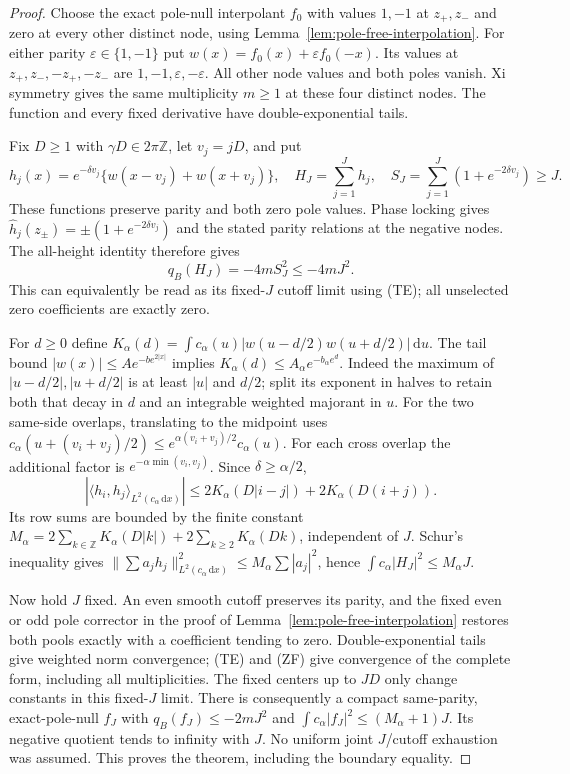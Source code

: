 \documentclass[11pt]{article}
\theoremstyle{remark}\newtheorem{remark}[theorem]{Remark}
\newcommand{\Z}{\mathbb Z}
\newcommand{\dd}{\,\mathrm d}
\begin{document}
\begin{proof}
Choose the exact pole-null interpolant $f_0$ with values
$1,-1$ at $z_+,z_-$ and zero at every other distinct node,
using Lemma~\ref{lem:pole-free-interpolation}.
For either parity $\varepsilon\in\{1,-1\}$ put
$w(x)=f_0(x)+\varepsilon f_0(-x)$. Its values at
$z_+,z_-,-z_+,-z_-$ are $1,-1,\varepsilon,-\varepsilon$.
All other node values and both poles vanish. Xi symmetry
gives the same multiplicity $m\ge1$ at these four distinct
nodes. The function and every fixed derivative have
double-exponential tails.

Fix $D\ge1$ with $\gamma D\in2\pi\Z$, let $v_j=jD$, and put
\[
 h_j(x)=e^{-\delta v_j}\{w(x-v_j)+w(x+v_j)\},\quad
 H_J=\sum_{j=1}^Jh_j,\quad
 S_J=\sum_{j=1}^J(1+e^{-2\delta v_j})\ge J .
                                                               \tag{HBC2}
\]
These functions preserve parity and both zero pole values.
Phase locking gives $\widehat h_j(z_\pm)
=\pm(1+e^{-2\delta v_j})$ and the stated parity relations
at the negative nodes. The all-height identity therefore gives
\[
                         q_B(H_J)=-4mS_J^2\le-4mJ^2 .  \tag{HBC3}
\]
This can equivalently be read as its fixed-$J$ cutoff limit
using (TE); all unselected zero coefficients are exactly zero.

For $d\ge0$ define
$K_\alpha(d)=\int c_\alpha(u)|w(u-d/2)w(u+d/2)|\dd u$.
The tail bound $|w(x)|\le A e^{-b e^{2|x|}}$ implies
$K_\alpha(d)\le A_\alpha e^{-b_\alpha e^d}$.
Indeed the maximum of $|u-d/2|,|u+d/2|$ is at least
$|u|$ and $d/2$; split its exponent in halves to retain
both that decay in $d$ and an integrable weighted majorant
in $u$. For the two same-side overlaps, translating to
the midpoint uses
$c_\alpha(u+(v_i+v_j)/2)\le
e^{\alpha(v_i+v_j)/2}c_\alpha(u)$.
For each cross overlap the additional factor is
$e^{-\alpha\min(v_i,v_j)}$.
Since $\delta\ge\alpha/2$,
\[
 |\langle h_i,h_j\rangle_{L^2(c_\alpha\dd x)}|
 \le2K_\alpha(D|i-j|)+2K_\alpha(D(i+j)).                 \tag{HBC4}
\]
Its row sums are bounded by the finite constant
$M_\alpha=2\sum_{k\in\Z}K_\alpha(D|k|)
+2\sum_{k\ge2}K_\alpha(Dk)$, independent of $J$.
Schur's inequality gives
$\|\sum a_jh_j\|_{L^2(c_\alpha\dd x)}^2
\le M_\alpha\sum|a_j|^2$, hence
$\int c_\alpha|H_J|^2\le M_\alpha J$.

Now hold $J$ fixed. An even smooth cutoff preserves its
parity, and the fixed even or odd pole corrector in the proof
of Lemma~\ref{lem:pole-free-interpolation} restores both pools
exactly with a coefficient tending to zero.
Double-exponential tails give weighted norm convergence;
(TE) and (ZF) give convergence of the complete form, including
all multiplicities. The fixed centers up to $JD$ only change
constants in this fixed-$J$ limit.
There is consequently a compact same-parity, exact-pole-null
$f_J$ with $q_B(f_J)\le-2mJ^2$ and
$\int c_\alpha|f_J|^2\le(M_\alpha+1)J$.
Its negative quotient tends to infinity with $J$.
No uniform joint $J$/cutoff exhaustion was assumed.
This proves the theorem, including the boundary equality.
\end{proof}
\end{document}
